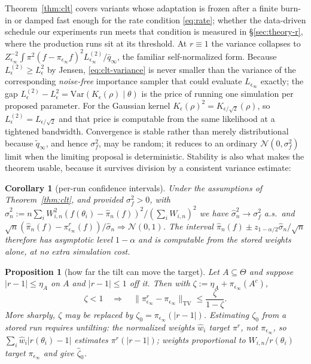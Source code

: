 \documentclass[10pt]{article}
\theoremstyle{plain}
\newtheorem{proposition}[theorem]{Proposition}
\newtheorem{corollary}[theorem]{Corollary}
\theoremstyle{definition}
\begin{document}
Theorem~\ref{thm:clt} covers variants whose adaptation is frozen after a finite burn-in or damped fast enough for the rate condition \eqref{eq:rate}; whether the data-driven schedule our experiments run meets that condition is measured in \S\ref{sec:theory-r}, where the production runs sit at its threshold. At $r\equiv1$ the variance collapses to $Z_{\epsilon_\infty}^{-2}\int\pi^2(f-\pi_{\epsilon_\infty}f)^2L^{(2)}_{\epsilon_\infty}/\bar q_\infty$, the familiar self-normalized form. Because $L^{(2)}_\epsilon\ge L^2_\epsilon$ by Jensen, \eqref{eq:clt-variance} is never smaller than the variance of the corresponding \emph{noise-free} importance sampler that could evaluate $L_{\epsilon_\infty}$ exactly; the gap $L^{(2)}_\epsilon-L^2_\epsilon=\mathrm{Var}(K_\epsilon(\rho)\mid\theta)$ is the price of running one simulation per proposed parameter. For the Gaussian kernel $K_\epsilon(\rho)^2=K_{\epsilon/\sqrt2}(\rho)$, so $L^{(2)}_\epsilon=L_{\epsilon/\sqrt2}$ and that price is computable from the same likelihood at a tightened bandwidth. Convergence is stable rather than merely distributional because $\tilde q_\infty$, and hence $\sigma^2_f$, may be random; it reduces to an ordinary $\mathcal{N}(0,\sigma^2_f)$ limit when the limiting proposal is deterministic. Stability is also what makes the theorem usable, because it survives division by a consistent variance estimate:

\begin{corollary}[per-run confidence intervals]\label{cor:ci}
Under the assumptions of Theorem~\ref{thm:clt}, and provided $\sigma^2_f>0$, with
$\widehat\sigma_n^2 := n\sum_i W_{i,n}^2(f(\theta_i)-\widehat\pi_n(f))^2 / (\sum_i W_{i,n})^2$
we have $\widehat\sigma^2_n\to\sigma^2_f$ a.s.\ and $\sqrt n(\widehat\pi_n(f)-\pi^r_{\epsilon_\infty}(f))/\widehat\sigma_n\Rightarrow\mathcal{N}(0,1)$. The interval $\widehat\pi_n(f)\pm z_{1-\alpha/2}\widehat\sigma_n/\sqrt n$ therefore has asymptotic level $1-\alpha$ and is computable from the stored weights alone, at no extra simulation cost.
\end{corollary}

\begin{proposition}[how far the tilt can move the target]\label{prop:tilt}
Let $A\subseteq\Theta$ and suppose $|r-1|\le\eta_A$ on $A$ and $|r-1|\le1$ off it. Then with $\zeta:=\eta_A+\pi_{\epsilon_\infty}(A^c)$,
\begin{equation}
\zeta<1\quad\Longrightarrow\quad\bigl\|\pi^r_{\epsilon_\infty}-\pi_{\epsilon_\infty}\bigr\|_{\mathrm{TV}}\le\frac{\zeta}{1-\zeta}.
\label{eq:tilt-bound}
\end{equation}
More sharply, $\zeta$ may be replaced by $\zeta_0=\pi_{\epsilon_\infty}(|r-1|)$. Estimating $\zeta_0$ from a stored run requires \emph{untilting}: the normalized weights $\widehat w_i$ target $\pi^r$, not $\pi_{\epsilon_\infty}$, so $\sum_i\widehat w_i|r(\theta_i)-1|$ estimates $\pi^r(|r-1|)$; weights proportional to $W_{i,n}/r(\theta_i)$ target $\pi_{\epsilon_\infty}$ and give $\widehat\zeta_0$.
\end{proposition}
\end{document}
